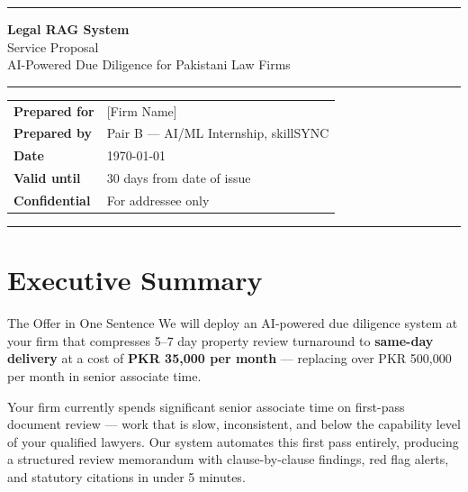 \documentclass[12pt, a4paper]{article}
\begin{document}
\begin{titlepage}
\centering
\vspace*{1.5cm}
{\color{primary}\rule{\textwidth}{2.5pt}}
\vspace{0.6cm}

{\Huge\bfseries\color{primary} Legal RAG System}\\[0.4cm]
{\LARGE\color{accent} Service Proposal}\\[0.3cm]
{\large AI-Powered Due Diligence for Pakistani Law Firms}

{\color{primary}\rule{\textwidth}{0.5pt}}
\vspace{1.5cm}

\begin{tabular}{@{}ll@{}}
  \textbf{Prepared for}  & [Firm Name] \\[0.2cm]
  \textbf{Prepared by}   & Pair B --- AI/ML Internship, skillSYNC \\[0.2cm]
  \textbf{Date}          & \today \\[0.2cm]
  \textbf{Valid until}   & 30 days from date of issue \\[0.2cm]
  \textbf{Confidential}  & For addressee only \\
\end{tabular}

\vfill
{\color{primary}\rule{\textwidth}{2.5pt}}
\end{titlepage}

\tableofcontents
\newpage

\section{Executive Summary}

\begin{highlight}{The Offer in One Sentence}
We will deploy an AI-powered due diligence system at your firm that compresses
5--7 day property review turnaround to \textbf{same-day delivery} at a cost of
\textbf{PKR 35,000 per month} --- replacing over PKR 500,000 per month in
senior associate time.
\end{highlight}

Your firm currently spends significant senior associate time on first-pass document
review --- work that is slow, inconsistent, and below the capability level of your
qualified lawyers. Our system automates this first pass entirely, producing a
structured review memorandum with clause-by-clause findings, red flag alerts, and
statutory citations in under 5 minutes.
\end{document}
